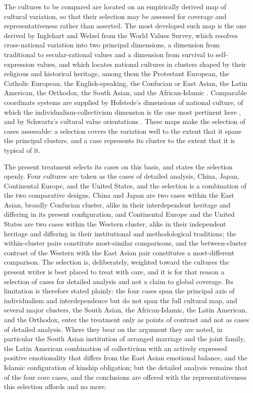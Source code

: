 The cultures to be compared are located on an empirically derived map of cultural variation, so that their selection may be assessed for coverage and representativeness rather than asserted. The most developed such map is the one derived by Inglehart and Welzel from the World Values Survey, which resolves cross-national variation into two principal dimensions, a dimension from traditional to secular-rational values and a dimension from survival to self-expression values, and which locates national cultures in clusters shaped by their religious and historical heritage, among them the Protestant European, the Catholic European, the English-speaking, the Confucian or East Asian, the Latin American, the Orthodox, the South Asian, and the African-Islamic \parencite{inglehart2005}. Comparable coordinate systems are supplied by Hofstede's dimensions of national culture, of which the individualism-collectivism dimension is the one most pertinent here \parencite{hofstede2001}, and by Schwartz's cultural value orientations \parencite{schwartz2006}. These maps make the selection of cases assessable: a selection covers the variation well to the extent that it spans the principal clusters, and a case represents its cluster to the extent that it is typical of it.

The present treatment selects its cases on this basis, and states the selection openly. Four cultures are taken as the cases of detailed analysis, China, Japan, Continental Europe, and the United States, and the selection is a combination of the two comparative designs. China and Japan are two cases within the East Asian, broadly Confucian cluster, alike in their interdependent heritage and differing in its present configuration, and Continental Europe and the United States are two cases within the Western cluster, alike in their independent heritage and differing in their institutional and methodological traditions; the within-cluster pairs constitute most-similar comparisons, and the between-cluster contrast of the Western with the East Asian pair constitutes a most-different comparison. The selection is, deliberately, weighted toward the cultures the present writer is best placed to treat with care, and it is for that reason a selection of cases for detailed analysis and not a claim to global coverage. Its limitation is therefore stated plainly: the four cases span the principal axis of individualism and interdependence but do not span the full cultural map, and several major clusters, the South Asian, the African-Islamic, the Latin American, and the Orthodox, enter the treatment only as points of contrast and not as cases of detailed analysis. Where they bear on the argument they are noted, in particular the South Asian institution of arranged marriage and the joint family, the Latin American combination of collectivism with an actively expressed positive emotionality that differs from the East Asian emotional balance, and the Islamic configuration of kinship obligation; but the detailed analysis remains that of the four core cases, and the conclusions are offered with the representativeness this selection affords and no more.

